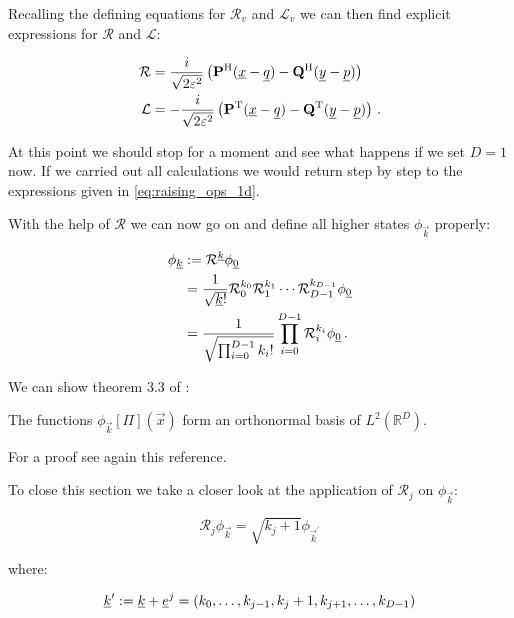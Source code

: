 Recalling the defining equations for $\mathcal{R}_v$ and $\mathcal{L}_v$ we can
then find explicit expressions for $\mathcal{R}$ and $\mathcal{L}$:

\begin{align} \label{eq:raising_ops_Dd_explicit}
  \mathcal{R} & =  \frac{i}{\sqrt{2\varepsilon^2}} \left( \mathbf{P}{}^{\textnormal{H}} (\underline{x}-\underline{q}) - \mathbf{Q}{}^{\textnormal{H}} (\underline{y}-\underline{p}) \right) \\
  \mathcal{L} & = -\frac{i}{\sqrt{2\varepsilon^2}} \left( \mathbf{P}{}^{\textnormal{T}} (\underline{x}-\underline{q}) - \mathbf{Q}{}^{\textnormal{T}} (\underline{y}-\underline{p}) \right) \,.
\end{align}

At this point we should stop for a moment and see what happens if we set $D=1$ now.
If we carried out all calculations we would return step by step to the expressions
given in \eqref{eq:raising_ops_1d}.

With the help of $\mathcal{R}$ we can now go on and define all higher states
$\phi_{\vec{k}}$ properly:

\begin{align} \label{eq:construct_phi_k}
  \phi_{\underline{k}} & := \mathcal{R}^{\underline{k}} \phi_{\underline{0}} \\
                 & = \frac{1}{\sqrt{\underline{k}!}} \mathcal{R}_0^{k_0} \mathcal{R}_1^{k_1} \cdots \mathcal{R}_{D-1}^{k_{D-1}} \phi_{\underline{0}} \\
                 & = \frac{1}{\sqrt{\prod_{i=0}^{D-1}k_i!}} \prod_{i=0}^{D-1} \mathcal{R}_i^{k_i} \phi_{\underline{0}} \,.
\end{align}

We can show theorem 3.3 of \cite{H_ladder_operators}:

\begin{theorem}
  The functions $\phi_{\vec{k}}\left[\Pi\right](\vec{x})$ form an orthonormal
  basis of $L^2 \left(\mathbb{R}^D \right)$.
\end{theorem}

For a proof see again this reference.

To close this section we take a closer look at the application of $\mathcal{R}_j$
on $\phi_{\vec{k}}$:

\begin{equation} \label{eq:r_op_applied_1}
  \mathcal{R}_j \phi_{\vec{k}} = \sqrt{k_j + 1} \phi_{\vec{k}^\prime}
\end{equation}

where:

\begin{equation}
  \underline{k}^\prime := \underline{k} + \underline{e}^j = (k_0, \ldots, k_{j-1}, k_j+1, k_{j+1}, \ldots, k_{D-1})
\end{equation}

